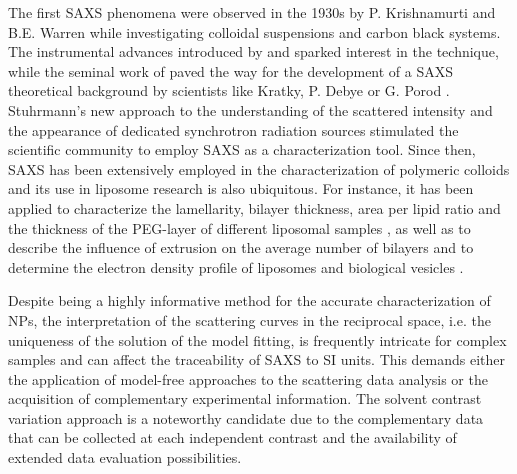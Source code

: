 The first SAXS phenomena were observed in the 1930s by P. Krishnamurti and B.E. Warren \citep{krishnamurti_studies_1930,krishnamurti_studies_1930-1, warren_xray_1934} while investigating colloidal suspensions and carbon black systems. The instrumental advances introduced by \cite{kratky_berechnung_1938} and \cite{guinier_dispositif_1937} sparked interest in the technique, while the seminal work of \cite{guinier_diffraction_1939} paved the way for the development of a SAXS theoretical background by scientists like Kratky, P. Debye or G. Porod \citep{kratky_bestimmung_1943,debye_scattering_1949,kratky_diffuse_1949,guinier_study_1950,guinier_small-angle_1955}. Stuhrmann's new approach to the understanding of the scattered intensity \citep{stuhrmann_elimination_1965} and the appearance of dedicated synchrotron radiation sources stimulated the scientific community to employ SAXS as a characterization tool. Since then, SAXS has been extensively employed in the characterization of polymeric colloids \citep{dingenouts_analysis_1999,chu_small-angle_2001,ballauff_analysis_2011} and its use in liposome research is also ubiquitous. For instance, it has been applied to characterize the lamellarity, bilayer thickness, area per lipid ratio \citep{pabst_applications_2010,bouwstra_small_1993,brzustowicz_x-ray_2005} and the thickness of the PEG-layer of different liposomal samples \citep{varga_closer_2010,varga_characterization_2012}, as well as to describe the influence of extrusion on the average number of bilayers \citep{jousma_characterization_1987} and to determine the electron density profile of liposomes \citep{bouwstra_small_1993,brzustowicz_x-ray_2005,hirai_determination_2003} and biological vesicles \citep{castorph_structure_2010}.

Despite being a highly informative method for the accurate characterization of NPs, the interpretation of the scattering curves in the reciprocal space, i.e. the uniqueness of the solution of the model fitting, is frequently intricate for complex samples \citep{mykhaylyk_structural_2012} and can affect the traceability of SAXS to SI units. This demands either the application of model-free approaches to the scattering data analysis or the acquisition of complementary experimental information. The solvent contrast variation approach is a noteworthy candidate due to the complementary data that can be collected at each independent contrast and the availability of extended data evaluation possibilities.

